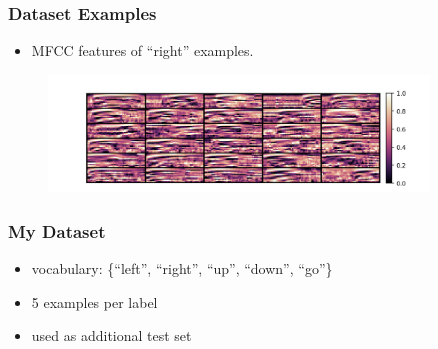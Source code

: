 \begin{frame}
  \frametitle{Dataset Examples}
  \begin{itemize}
    \item MFCC features of \enquote{right} examples.
  \end{itemize}
  \begin{figure}[!ht]
    \centering
    \includegraphics[width=0.9\textwidth]{../5_exp/figs/exp_dataset_speech_cmd_mfcc_right.png}
  \end{figure}
\end{frame}

\begin{frame}
  \frametitle{My Dataset}
  \begin{itemize}
    \item vocabulary: \{\enquote{left}, \enquote{right}, \enquote{up}, \enquote{down}, \enquote{go}\}
    \item 5 examples per label
    \item used as additional test set
  \end{itemize}
  \begin{figure}[!ht]
    \centering
  \end{figure}
\end{frame}

